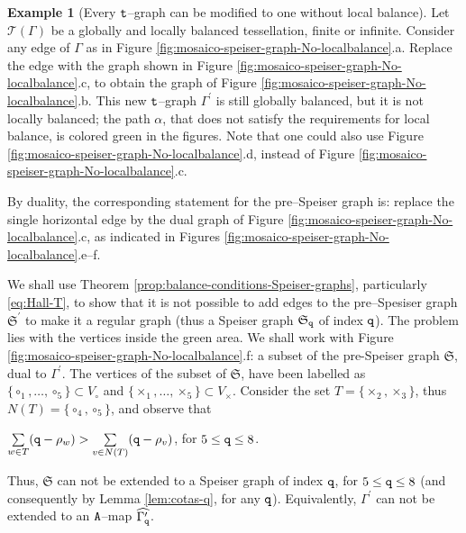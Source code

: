 \documentclass[final,3p,times]{elsarticle}
\theoremstyle{definition}
\newtheorem{example}{Example}[section]
\begin{document}
\begin{example}[Every $\tt t$--graph can be modified to one
without local balance]
\label{example:non-locally-balanced}
Let $\mathscr{T}(\Gamma)$ 
be a globally
and locally balanced tessellation, finite or infinite.
Consider 
any edge of $\Gamma$
as in Figure \ref{fig:mosaico-speiser-graph-No-localbalance}.a.
Replace the edge with the graph shown in  
Figure \ref{fig:mosaico-speiser-graph-No-localbalance}.c, 
to obtain the graph of Figure \ref{fig:mosaico-speiser-graph-No-localbalance}.b.
This new $\tt t$--graph $\Gamma^\prime$ is still globally balanced, 
but it is not locally balanced;
the path $\alpha$, that does not satisfy the 
requirements for local balance, 
is colored green in the figures. 
Note that one could also use Figure \ref{fig:mosaico-speiser-graph-No-localbalance}.d, 
instead of Figure \ref{fig:mosaico-speiser-graph-No-localbalance}.c.

\noindent
By duality, the corresponding statement for the pre--Speiser graph is: replace 
the single horizontal edge by the dual graph of 
Figure \ref{fig:mosaico-speiser-graph-No-localbalance}.c, as indicated
in Figures \ref{fig:mosaico-speiser-graph-No-localbalance}.e--f.

We shall use 
Theorem \ref{prop:balance-conditions-Speiser-graphs}, 
particularly \eqref{eq:Hall-T}, to show that 
it is not possible to add edges to the 
pre--Spesiser graph $\mathfrak{S}^\prime$ to
make it a regular graph (thus a Speiser graph $\mathfrak{S}_{\tt q}$ of index $\tt q$). 
The problem lies with the vertices inside the green area.
We shall work with Figure \ref{fig:mosaico-speiser-graph-No-localbalance}.f: 
a subset of the pre-Speiser graph $\mathfrak{S}$, dual to $\Gamma^\prime$.
The vertices of the subset of $\mathfrak{S}$, have been labelled as 
$\{ \circ_1, \ldots, \circ_5\}\subset V_\circ$ and 
$\{ \times_1, \ldots, \times_5\}\subset V_\times$.
Consider the set
$T=\{\times_2, \times_3\}$, thus $N(T)=\{\circ_4, \circ_5\}$, 
and observe that 

\centerline{
$\sum\limits_{w\in T} ({\tt q}-\rho_w) > \sum\limits_{v\in N(T)} ({\tt q}-\rho_v)$,
\quad for $5\leq {\tt q} \leq 8$.
}

\noindent
Thus, $\mathfrak{S}$ can not be extended to a Speiser graph of index $\tt q$, 
for $5\leq {\tt q} \leq 8$ (and consequently by Lemma \ref{lem:cotas-q}, 
for any $\tt q$).
Equivalently, $\Gamma^\prime$ can not be extended to an 
$\tt A$--map 
$\widehat{\Gamma_{\tt q}^\prime}$. 


\end{example}
\end{document}
